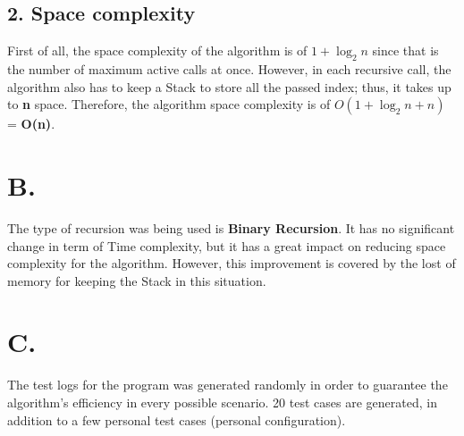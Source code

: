 \documentclass[16pt, letterpaper]{article}
\begin{document}
\subsection*{2. Space complexity}
First of all, the space complexity of the algorithm is of $1 + \log_2 n$ since that is the number of maximum active calls at once. However, in each recursive call, the algorithm also has to keep a Stack to store all the passed index; thus, it takes up to \textbf{n} space. Therefore, the algorithm space complexity is of $O(1 + \log_2 n + n)$ = \textbf{O(n)}.

\section*{B.}
The type of recursion was being used is \textbf{Binary Recursion}. It has no significant change in term of Time complexity, but it has a great impact on reducing space complexity for the algorithm. However, this improvement is covered by the lost of memory for keeping the Stack in this situation.

\section*{C.}
The test logs for the program was generated randomly in order to guarantee the algorithm's efficiency in every possible scenario. 20 test cases are generated, in addition to a few personal test cases (personal configuration).
\end{document}
